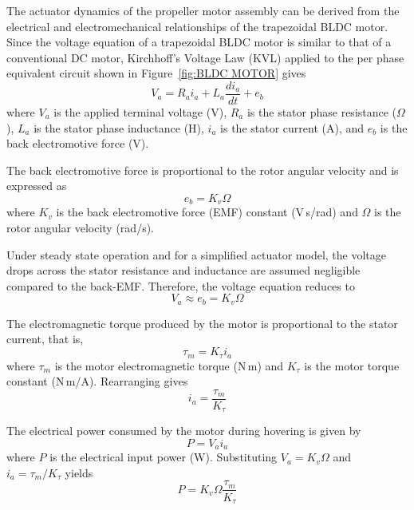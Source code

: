 \begin{small}


The actuator dynamics of the propeller motor assembly can be derived from the electrical and electromechanical relationships of the trapezoidal BLDC motor. Since the voltage equation of a trapezoidal BLDC motor is similar to that of a conventional DC motor, Kirchhoff’s Voltage Law (KVL) applied to the per phase equivalent circuit shown in Figure~\ref{fig:BLDC MOTOR} gives
\begin{equation}
V_a = R_a i_a + L_a \frac{di_a}{dt} + e_b
\end{equation}
where $V_a$ is the applied terminal voltage (V), $R_a$ is the stator phase resistance ($\Omega$), $L_a$ is the stator phase inductance (H), $i_a$ is the stator current (A), and $e_b$ is the back electromotive force (V).

The back electromotive force is proportional to the rotor angular velocity and is expressed as
\begin{equation}
e_b = K_v \Omega
\end{equation}
where $K_v$ is the back electromotive force (EMF)  constant (V\,s/rad) and $\Omega$ is the rotor angular velocity (rad/s).

Under steady state operation and for a simplified actuator model, the voltage drops across the stator resistance and inductance are assumed negligible compared to the back-EMF. Therefore, the voltage equation reduces to
\begin{equation}
V_a \approx e_b = K_v \Omega
\end{equation}

The electromagnetic torque produced by the motor is proportional to the stator current, that is,
\begin{equation}
\tau_m = K_{\tau} i_a
\end{equation}
where $\tau_m$ is the motor electromagnetic torque (N\,m) and $K_{\tau}$ is the motor torque constant (N\,m/A). Rearranging gives
\begin{equation}
i_a = \frac{\tau_m}{K_{\tau}}
\end{equation}

The electrical power consumed by the motor during hovering is given by
\begin{equation}
P = V_a i_a
\end{equation}
where $P$ is the electrical input power (W). Substituting $V_a = K_v \Omega$ and $i_a = \tau_m / K_{\tau}$ yields
\begin{equation}
P = K_v \Omega \frac{\tau_m}{K_{\tau}}
\end{equation}


\end{small}
